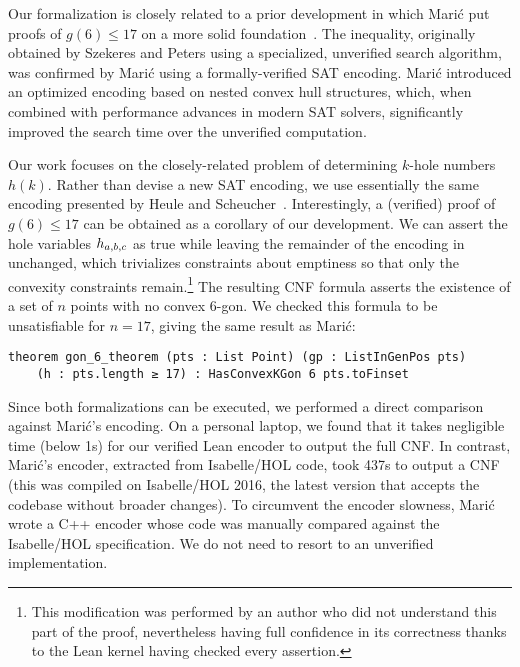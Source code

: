 Our formalization is closely related to a prior development
in which Marić put proofs of $g(6) \leq 17$ on a more solid foundation~\cite{19maric_fast_formal_proof_erdos_szekeres_conjecture_convex_polygons_most_six_points}.
The inequality,
originally obtained by Szekeres and Peters \cite{06szekeres_computer_solution_17_point_erdos_szekeres_problem}
using a specialized, unverified search algorithm,
was confirmed by Marić using a formally-verified SAT encoding.
Marić introduced an optimized encoding based on nested convex hull structures,
which, when combined with performance advances in modern SAT solvers,
significantly improved the search time over the unverified computation.

Our work focuses on the closely-related problem
of determining $k$-hole numbers $h(k)$.
Rather than devise a new SAT encoding,
we use essentially the same encoding presented by Heule and Scheucher~\cite{emptyHexagonNumber}.
Interestingly,
a (verified) proof of $g(6) \leq 17$ can be obtained
as a corollary of our development.
We can assert the hole variables $\hvar_{a,b,c}$ as true
while leaving the remainder of the encoding in~ unchanged,
which trivializes constraints about emptiness
so that only the convexity constraints remain.\footnote{
This modification was performed by an author
who did not understand this part of the proof,
nevertheless having full confidence in its correctness
thanks to the Lean kernel having checked every assertion.}
The resulting CNF formula
asserts the existence of a set of $n$ points
with no convex $6$-gon.
We checked this formula to be unsatisfiable for $n = 17$,
giving the same result as Marić:
\begin{lstlisting}
theorem gon_6_theorem (pts : List Point) (gp : ListInGenPos pts)
    (h : pts.length ≥ 17) : HasConvexKGon 6 pts.toFinset
\end{lstlisting}

Since both formalizations can be executed,
we performed a direct comparison against Marić's encoding.
On a personal laptop,
we found that it takes negligible time (below 1s)
for our verified Lean encoder to output the full CNF.
In contrast,
Marić's encoder, extracted from Isabelle/HOL code,
took 437s to output a CNF
(this was compiled on Isabelle/HOL 2016,
the latest version that accepts the codebase without broader changes).
To circumvent the encoder slowness,
Marić wrote a C++ encoder
whose code was manually compared against the Isabelle/HOL specification.
We do not need to resort to an unverified implementation.

